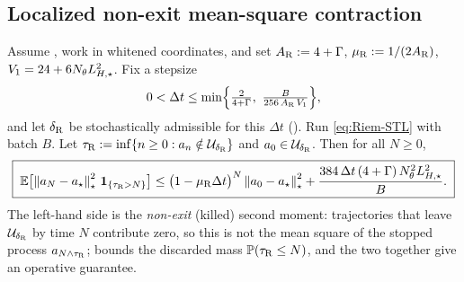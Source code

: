 \subsection{Localized non-exit mean-square contraction}
\label{subsec:local-contraction}

\begin{theorem}
\label{thm:stoch-local-Riem}
Assume , work in whitened coordinates, and set
$A_{\mathrm{R}}:=4+\Gamma$, $\mu_{\mathrm{R}}:=1/(2A_{\mathrm{R}})$, $V_1=24+6N_\theta L_{H,\star}^2$. Fix a stepsize
\[
    0<\Delta t\leq\min\Bigl\{\tfrac{2}{4+\Gamma},\ \tfrac{B}{256\,A_{\Riem}\,V_1}\Bigr\},
\]
and let $\delta_{\mathrm{R}}$ be stochastically admissible for this $\Delta t$ ().
Run \eqref{eq:Riem-STL} with batch $B$.
Let $\tau_{\mathrm{R}}:=\inf\{n\geq0:a_n\notin\mathcal{U}_{\delta_{\mathrm{R}}}\}$ and $a_0\in\mathcal{U}_{\delta_{\mathrm{R}}}$.
Then for all $N\geq0$,
\[
    \boxed{\;
    \mathbb{E}\bigl[\left\lVert a_N-a_\star\right\rVert_\star^2\,\mathbf 1_{\{\tau_{\mathrm{R}}>N\}}\bigr]
    \leq\bigl(1-\mu_{\mathrm{R}}\Delta t\bigr)^N\left\lVert a_0-a_\star\right\rVert_\star^2
    +\frac{384\,\Delta t\,(4+\Gamma)\,N_\theta^2L_{H,\star}^2}{B}.
    \;}
\]
The left-hand side is the \emph{non-exit} (killed) second moment: trajectories that leave
$\mathcal{U}_{\delta_{\mathrm{R}}}$ by time $N$ contribute zero, so this is not the mean square of the stopped
process $a_{N\wedge\tau_{\mathrm{R}}}$;  bounds the discarded mass
$\mathbb{P}(\tau_{\mathrm{R}}\leq N)$, and the two together give an operative guarantee.
\end{theorem}

